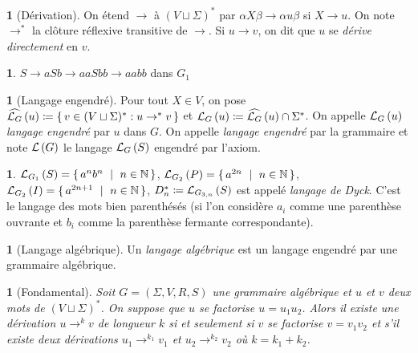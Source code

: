 \documentclass[10pt,a4paper,notitlepage]{article}
\theoremstyle{plain}
\theoremstyle{definition}
\newtheorem{defn}[thm]{\protect\definitionname}
\theoremstyle{definition}
\newtheorem{example}[thm]{\protect\examplename}
\theoremstyle{remark}
\theoremstyle{remark}
\theoremstyle{plain}
\newtheorem{lem}[thm]{\protect\lemmaname}
\theoremstyle{plain}
\theoremstyle{plain}
\theoremstyle{remark}
\providecommand{\definitionname}{Définition}
\providecommand{\examplename}{Exemple}
\providecommand{\lemmaname}{Lemme}
\begin{document}
\begin{defn}[Dérivation]
	On étend $\to$ à $(V\sqcup\Sigma)^*$ par $\alpha X \beta \to \alpha u \beta$ si $X\to u$. On note $\to^*$ la clôture réflexive transitive de $\to$. Si $u\to v$, on dit que $u$ se \emph{dérive directement} en $v$.
\end{defn}

\begin{example}
	$S\to aSb\to aaSbb\to aabb$ dans $G_{1}$
\end{example}

\begin{defn}[Langage engendré]
	Pour tout $X\in V$, on pose $\widehat{\mathcal{L}_{G}}\left(u\right)\coloneqq \set{v\in (V\sqcup\Sigma)^*:u\to^* v}$ et $\mathcal{L}_{G}\left(u\right)\coloneqq \widehat{\mathcal{L}_{G}}\left(u\right)\cap \Sigma^*$. On appelle $\mathcal{L}_{G}\left(u\right)$ \emph{langage engendré} par $u$ dans $G$. On appelle \emph{langage engendré} par la grammaire et note $\mathcal{L}\left(G\right)$ le langage $\mathcal{L}_{G}\left(S\right)$ engendré par l'axiom.
\end{defn}

\begin{example}
	$\L_{G_{1}}\left(S\right)=\set{a^{n}b^{n}\ |\ n\in\N}$, $\L_{G_{2}}\left(P\right)=\set{a^{2n}\ |\ n\in\N}$,
	$\L_{G_{2}}\left(I\right)=\set{a^{2n+1}\ |\ n\in\N}$, $D_{n}^{*}\coloneqq\mathcal{L}_{G_{3,n}}\left(S\right)$
	est appelé \emph{langage de Dyck}\label{dyck}. C'est le langage des mots bien parenthésés
	(si l'on considère $a_{i}$ comme une parenthèse ouvrante et $b_{i}$
	comme la parenthèse fermante correspondante).
\end{example}

\begin{defn}[Langage algébrique]
	Un \emph{langage algébrique} est un langage engendré par une grammaire algébrique.
\end{defn}

\begin{lem}[Fondamental]
	Soit $G=(\Sigma,V,R,S)$ une grammaire algébrique et $u$ et $v$ deux mots de $(V\sqcup \Sigma)^*$. On suppose que $u$ se factorise $u=u_1u_2$. Alors il existe une dérivation $u\to^k v$ de longueur $k$ si et seulement si $v$ se factorise $v=v_1v_2$ et s'il existe deux dérivations $u_1\to^{k_1}v_1$ et $u_2\to^{k_2}v_2$ où $k=k_1+k_2$.
\end{lem}



\end{document}
